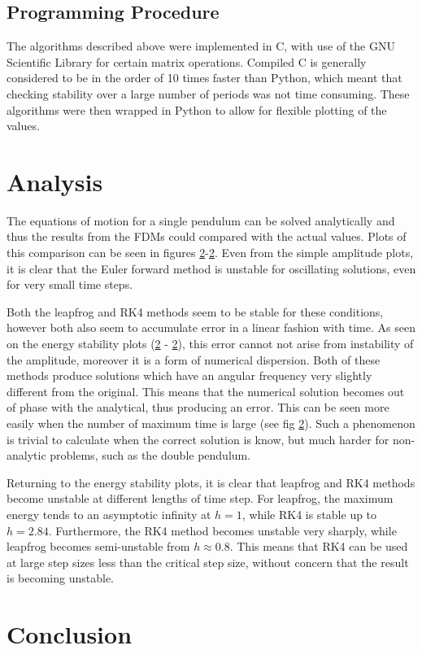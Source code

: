 \documentclass[a4paper,11pt]{article}
\begin{document}
	\subsection{Programming Procedure}
	The algorithms described above were implemented in C, with use of the GNU Scientific Library for certain matrix operations. Compiled C is generally considered to be in the order of 10 times faster than Python, which meant that checking stability over a large number of periods was not time consuming. These algorithms were then wrapped in Python to allow for flexible plotting of the values.
	
	\section{Analysis}
	The equations of motion for a single pendulum can be solved analytically and thus the results from the FDMs could compared with the actual values. Plots of this comparison can be seen in figures \ref{}-\ref{}. Even from the simple amplitude plots, it is clear that the Euler forward method is unstable for oscillating solutions, even for very small time steps.
	
	Both the leapfrog and RK4 methods seem to be stable for these conditions, however both also seem to accumulate error in a linear fashion with time. As seen on the energy stability plots (\ref{} - \ref{}), this error cannot not arise from instability of the amplitude, moreover it is a form of numerical dispersion. Both of these methods produce solutions which have an angular frequency very slightly different from the original. This means that the numerical solution becomes out of phase with the analytical, thus producing an error. This can be seen more easily when the number of maximum time is large (see fig \ref{}). Such a phenomenon is trivial to calculate when the correct solution is know, but much harder for non-analytic problems, such as the double pendulum.
	
	Returning to the energy stability plots, it is clear that leapfrog and RK4 methods become unstable at different lengths of time step. For leapfrog, the maximum energy tends to an asymptotic infinity at $h=1$, while RK4 is stable up to $h=2.84$. Furthermore, the RK4 method becomes unstable very sharply, while leapfrog becomes semi-unstable from $h\approx0.8$. This means that RK4 can be used at large step sizes less than the critical step size, without concern that the result is becoming unstable. 
		
	\section{Conclusion}
	
\end{document}
